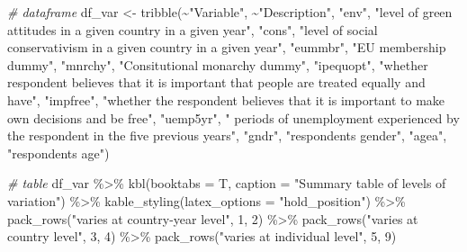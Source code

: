\documentclass[
]{article}
\newenvironment{Shaded}{\begin{snugshade}}{\end{snugshade}}
\newcommand{\AttributeTok}[1]{\textcolor[rgb]{0.77,0.63,0.00}{#1}}
\newcommand{\CommentTok}[1]{\textcolor[rgb]{0.56,0.35,0.01}{\textit{#1}}}
\newcommand{\DecValTok}[1]{\textcolor[rgb]{0.00,0.00,0.81}{#1}}
\newcommand{\FunctionTok}[1]{\textcolor[rgb]{0.00,0.00,0.00}{#1}}
\newcommand{\NormalTok}[1]{#1}
\newcommand{\OtherTok}[1]{\textcolor[rgb]{0.56,0.35,0.01}{#1}}
\newcommand{\SpecialCharTok}[1]{\textcolor[rgb]{0.00,0.00,0.00}{#1}}
\newcommand{\StringTok}[1]{\textcolor[rgb]{0.31,0.60,0.02}{#1}}
\begin{document}
\begin{Shaded}
\begin{Highlighting}[]
\CommentTok{\# dataframe }
\NormalTok{df\_var }\OtherTok{\textless{}{-}} \FunctionTok{tribble}\NormalTok{(}\SpecialCharTok{\textasciitilde{}}\StringTok{"Variable"}\NormalTok{, }\SpecialCharTok{\textasciitilde{}}\StringTok{"Description"}\NormalTok{, }
                  \StringTok{"env"}\NormalTok{, }\StringTok{"level of green attitudes in a given country in a given year"}\NormalTok{,}
                  \StringTok{"cons"}\NormalTok{, }\StringTok{"level of social conservativism in a given country in a given year"}\NormalTok{,}
                  \StringTok{"eummbr"}\NormalTok{, }\StringTok{"EU membership dummy"}\NormalTok{, }
                  \StringTok{"mnrchy"}\NormalTok{, }\StringTok{"Consitutional monarchy dummy"}\NormalTok{,}
                  \StringTok{"ipequopt"}\NormalTok{, }\StringTok{"whether respondent believes that it is important that people are treated equally and have"}\NormalTok{,}
                  \StringTok{"impfree"}\NormalTok{, }\StringTok{"whether the respondent believes that it is important to make own decisions and be free"}\NormalTok{,}
                  \StringTok{"uemp5yr"}\NormalTok{, }\StringTok{" periods of unemployment experienced by the respondent in the five previous years"}\NormalTok{,}
                  \StringTok{"gndr"}\NormalTok{, }\StringTok{"respondent\textquotesingle{}s gender"}\NormalTok{, }
                  \StringTok{"agea"}\NormalTok{, }\StringTok{"respondent\textquotesingle{}s age"}\NormalTok{)}

\CommentTok{\# table}
\NormalTok{df\_var }\SpecialCharTok{\%\textgreater{}\%}
  \FunctionTok{kbl}\NormalTok{(}\AttributeTok{booktabs =}\NormalTok{ T, }\AttributeTok{caption =} \StringTok{"Summary table of levels of variation"}\NormalTok{) }\SpecialCharTok{\%\textgreater{}\%}
  \FunctionTok{kable\_styling}\NormalTok{(}\AttributeTok{latex\_options =} \StringTok{"hold\_position"}\NormalTok{) }\SpecialCharTok{\%\textgreater{}\%}
  \FunctionTok{pack\_rows}\NormalTok{(}\StringTok{"varies at country{-}year level"}\NormalTok{, }\DecValTok{1}\NormalTok{, }\DecValTok{2}\NormalTok{) }\SpecialCharTok{\%\textgreater{}\%}
  \FunctionTok{pack\_rows}\NormalTok{(}\StringTok{"varies at country level"}\NormalTok{, }\DecValTok{3}\NormalTok{, }\DecValTok{4}\NormalTok{) }\SpecialCharTok{\%\textgreater{}\%}
  \FunctionTok{pack\_rows}\NormalTok{(}\StringTok{"varies at individual level"}\NormalTok{, }\DecValTok{5}\NormalTok{, }\DecValTok{9}\NormalTok{)}
\end{Highlighting}
\end{Shaded}
\end{document}
